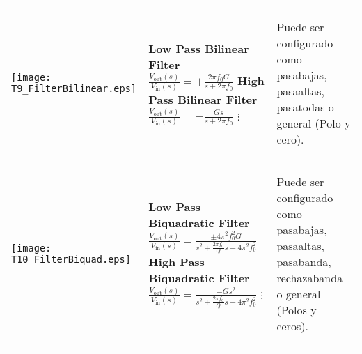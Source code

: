 \begin{table}[!ht]
\begin{tabular}{>{\centering\arraybackslash}m{3cm} >{\centering\arraybackslash}m{5cm} >{\centering\arraybackslash}m{5cm}}
    {\scriptsize \textbf{FilterBilinear}} \linebreak
    \texttt{[image: T9\_FilterBilinear.eps]}
    &
      \begin{scriptsize}
		 \textbf{Low Pass Bilinear Filter} \linebreak
      	 $\frac{V_{\mathrm{out}}(s)}{V_{\mathrm{in}}(s)} = \pm \frac{2 \pi f_{0} G}{s + 2 \pi f_{0}}$ \linebreak
      	 \textbf{High Pass Bilinear Filter} \linebreak
      	 $\frac{V_{\mathrm{out}}(s)}{V_{\mathrm{in}}(s)} = - \frac{Gs}{s + 2 \pi f_{0}}$ \linebreak
      	 $\vdots$
      \end{scriptsize}
    & 
      \begin{itemize}[leftmargin=0cm,noitemsep]
      \begin{scriptsize}
		\item[] Puede ser configurado como pasabajas, pasaaltas, pasatodas o general (Polo y cero).
      \end{scriptsize}
      \end{itemize}
    \\ %
    {\scriptsize \textbf{FilterBiquad}} \linebreak
    \texttt{[image: T10\_FilterBiquad.eps]}
    &
      \begin{scriptsize}
		 \textbf{Low Pass Biquadratic Filter} \linebreak
      	 $\frac{V_{\mathrm{out}}(s)}{V_{\mathrm{in}}(s)} = \frac{\pm 4 \pi^{2} f_{0}^{2} G}{s^{2} + \frac{2 \pi f_{0}}{Q}s + 4 \pi^{2} f_{0}^{2}}$ \linebreak
      	 \textbf{High Pass Biquadratic Filter} \linebreak
      	 $\frac{V_{\mathrm{out}}(s)}{V_{\mathrm{in}}(s)} = \frac{-G s^{2}}{s^{2} + \frac{2 \pi f_{0}}{Q} s + 4 \pi^{2} f_{0}^{2}}$ \linebreak
      	 $\vdots$
      \end{scriptsize}
    & 
      \begin{itemize}[leftmargin=0cm,noitemsep]
      \begin{scriptsize}
		\item[] Puede ser configurado como pasabajas, pasaaltas, pasabanda, rechazabanda o general (Polos y ceros).
      \end{scriptsize}
      \end{itemize}
    \\ %
    \hline
  \end{tabular}
\end{table}

